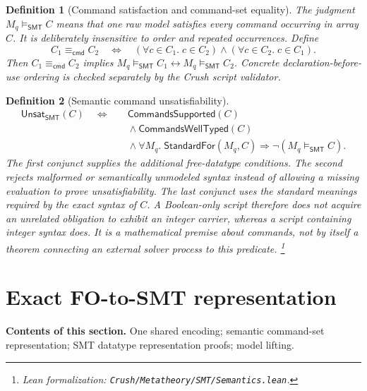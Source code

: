 \documentclass[11pt]{article}
\newtheorem{definition}{Definition}[section]
\theoremstyle{remark}
\newcommand{\leanfile}[1]{\footnote{Lean formalization: \texttt{Crush/Metatheory/#1}.}}
\newcommand{\sectioncontents}[1]{%
  \smallskip\noindent\textbf{Contents of this section.} #1\par\medskip}
\newcommand{\smtsat}{\models_{\mathsf{SMT}}}
\newcommand{\unsat}{\mathsf{Unsat}}
\newcommand{\SameCmd}{\mathrel{\equiv_{\mathsf{cmd}}}}
\begin{document}
\begin{definition}[Command satisfaction and command-set equality]
The judgment $M_q\smtsat C$ means that one raw model satisfies every command
occurring in array $C$. It is deliberately insensitive to order and repeated
occurrences. Define
\[
 C_1\SameCmd C_2
 \quad\Longleftrightarrow\quad
 (\forall c\in C_1.\;c\in C_2)\land
 (\forall c\in C_2.\;c\in C_1).
\]
Then $C_1\SameCmd C_2$ implies
$M_q\smtsat C_1\leftrightarrow M_q\smtsat C_2$. Concrete declaration-before-use
ordering is checked separately by the Crush script validator.
\end{definition}

\begin{definition}[Semantic command unsatisfiability]
\[
\begin{aligned}
 \unsat_{\mathsf{SMT}}(C)\quad\Longleftrightarrow\quad
 {}&\mathsf{CommandsSupported}(C)\\
 &{}\land \mathsf{CommandsWellTyped}(C)\\
 &{}\land \forall M_q.\;
   \mathsf{StandardFor}(M_q,C)\Rightarrow\neg(M_q\smtsat C).
\end{aligned}
\]
The first conjunct supplies the additional free-datatype conditions. The second
rejects malformed or semantically unmodeled syntax instead of allowing a
missing evaluation to prove unsatisfiability. The last conjunct uses the
standard meanings required by the exact syntax of $C$. A Boolean-only script
therefore does not acquire an unrelated obligation to exhibit an integer
carrier, whereas a script containing integer syntax does. It is a mathematical
premise about commands, not by itself a theorem connecting an external solver
process to this predicate.
\leanfile{SMT/Semantics.lean}
\end{definition}

\section{Exact FO-to-SMT representation}
\sectioncontents{One shared encoding; semantic command-set representation; SMT datatype representation proofs; model lifting.}
\end{document}
